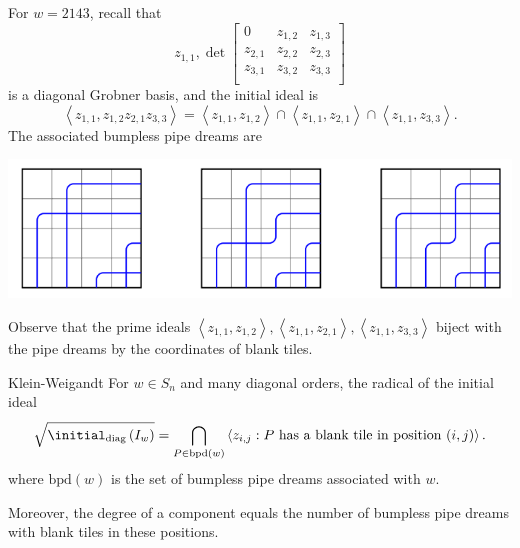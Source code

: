 \documentclass[co439]{subfiles}
\begin{document}
    \begin{example}{}
        For $w=2143$, recall that
        \begin{equation*}
            z_{1,1},
            \det
            \begin{bmatrix}
                0 & z_{1,2} & z_{1,3} \\
                z_{2,1} & z_{2,2} & z_{2,3} \\
                z_{3,1} & z_{3,2} & z_{3,3} \\
            \end{bmatrix}
        \end{equation*}
        is a diagonal Grobner basis, and the initial ideal is
        \begin{equation*}
            \left< z_{1,1}, z_{1,2}z_{2,1}z_{3,3} \right> = \left< z_{1,1},z_{1,2} \right> \cap \left< z_{1,1},z_{2,1} \right> \cap \left< z_{1,1},z_{3,3} \right>.    
        \end{equation*}
        The associated bumpless pipe dreams are

        \begin{center}
            \includegraphics[scale=0.4]{bpd2143}
        \end{center}

        Observe that the prime ideals $\left< z_{1,1},z_{1,2} \right>, \left< z_{1,1},z_{2,1} \right>, \left< z_{1,1},z_{3,3} \right>$ biject with the pipe dreams by the coordinates of blank tiles.
    \end{example}
    
    \rruleline
    
    \begin{theorem}{Klein-Weigandt}
        For $w\in S_n$ and many diagonal orders, the radical of the initial ideal
        \begin{equation*}
            \sqrt{\initial_{\text{diag}}\left( I_w \right)} = \bigcap^{}_{P\in\text{bpd}\left( w \right)} \left< z_{i,j} : \text{$P$ has a blank tile in position $\left( i,j \right)$} \right> .
        \end{equation*}
        where $\text{bpd}\left( w \right)$ is the set of bumpless pipe dreams associated with $w$.

        Moreover, the degree of a component equals the number of bumpless pipe dreams with blank tiles in these positions.
    \end{theorem}
    
\end{document}
